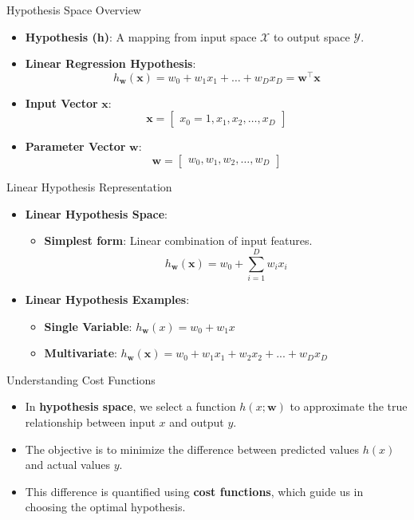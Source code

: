 \documentclass[serif, aspectratio=169]{beamer}
\begin{document}
\begin{frame}{Hypothesis Space Overview}
    \begin{itemize}
        \item \textbf{Hypothesis (h)}: A mapping from input space \( \mathcal{X} \) to output space \( \mathcal{Y} \).
        \item \textbf{Linear Regression Hypothesis}:
        \[
        h_{\mathbf{w}}(\mathbf{x}) = w_0 + w_1 x_1 + \dots + w_D x_D = \mathbf{w}^\top \mathbf{x}
        \]
        \item \textbf{Input Vector} \( \mathbf{x} \):
        \[
        \mathbf{x} = \begin{bmatrix} x_0 = 1, x_1, x_2, \dots, x_D \end{bmatrix}
        \]
        \item \textbf{Parameter Vector} \( \mathbf{w} \):
        \[
        \mathbf{w} = \begin{bmatrix} w_0, w_1, w_2, \dots, w_D \end{bmatrix}
        \]
    \end{itemize}
\end{frame}





\begin{frame}{Linear Hypothesis Representation}
    \begin{itemize}
        \item \textbf{Linear Hypothesis Space}:
        \begin{itemize}
            \item \textbf{Simplest form}: Linear combination of input features.
            \[
            h_{\mathbf{w}}(\mathbf{x}) = w_0 + \sum_{i=1}^{D} w_i x_i
            \]
        \end{itemize}
        \item \textbf{Linear Hypothesis Examples}:
        \begin{itemize}
            \item \textbf{Single Variable}: \( h_{\mathbf{w}}(x) = w_0 + w_1 x \)
            \item \textbf{Multivariate}: \( h_{\mathbf{w}}(\mathbf{x}) = w_0 + w_1 x_1 + w_2 x_2 + ... + w_D x_D \)
        \end{itemize}
    \end{itemize}
\end{frame}


\begin{frame}{Understanding Cost Functions}
    \begin{itemize}
        \item In \textbf{hypothesis space}, we select a function \( h(x; \mathbf{w}) \) to approximate the true relationship between input \( x \) and output \( y \).
        \item The objective is to minimize the difference between predicted values \( h(x) \) and actual values \( y \).
        \item This difference is quantified using \textbf{cost functions}, which guide us in choosing the optimal hypothesis.
    \end{itemize}
\end{frame}
\end{document}
